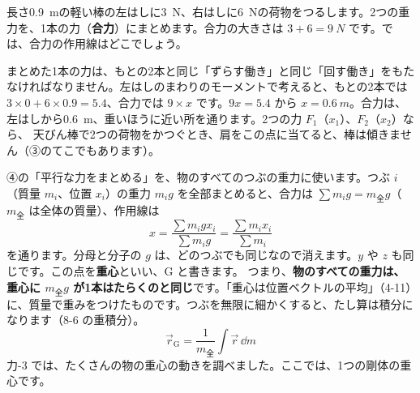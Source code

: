 \label{ph:力-5:heikou}
\noindent\begin{minipage}[c]{0.5\linewidth}
\centering
{}
\end{minipage}\hfill
\begin{minipage}[c]{0.46\linewidth}
長さ\qty{0.9}{m}の軽い棒の左はしに\qty{3}{N}、右はしに\qty{6}{N}の荷物をつるします。2つの重力を、1本の力（\textbf{合力}）にまとめます。合力の大きさは $3+6=\qty{9}{N}$ です。では、合力の作用線はどこでしょう。
\end{minipage}

\par\vspace{4pt}
\noindent まとめた1本の力は、もとの2本と同じ「ずらす働き」と同じ「回す働き」をもたなければなりません。左はしのまわりのモーメントで考えると、もとの2本では $3\times0+6\times0.9=5.4$、合力では $9\times x$ です。$9x=5.4$ から $x=\qty{0.6}{m}$。合力は、左はしから\qty{0.6}{m}、重いほうに近い所を通ります。2つの力 $F_1$（$x_1$）、$F_2$（$x_2$）なら、
天びん棒で2つの荷物をかつぐとき、肩をこの点に当てると、棒は傾きません（③のてこでもあります）。


\leavevmode\label{ph:力-5:sec5}④の「平行な力をまとめる」を、物のすべてのつぶの重力に使います。つぶ $i$（質量 $m_i$、位置 $x_i$）の重力 $m_ig$ を全部まとめると、合力は $\sum m_ig=m_{\text{全}}g$（$m_{\text{全}}$ は全体の質量）、作用線は
\[ x=\frac{\sum m_igx_i}{\sum m_ig}=\frac{\sum m_ix_i}{\sum m_i} \]
を通ります。分母と分子の $g$ は、どのつぶでも同じなので消えます。$y$ や $z$ も同じです。この点を\textbf{重心}といい、G と書きます。\label{ph:力-5:juushin}
\noindent つまり、\textbf{物のすべての重力は、重心に $m_{\text{全}}g$ が1本はたらくのと同じ}です。「重心は位置ベクトルの平均」（4-11）に、質量で重みをつけたものです。つぶを無限に細かくすると、たし算は積分になります（8-6 の重積分）。
\[ \vec r_{\mathrm G}=\frac{1}{m_{\text{全}}}\int\vec r\,\dd m \]
力-3 では、たくさんの物の重心の動きを調べました。ここでは、1つの剛体の重心です。

